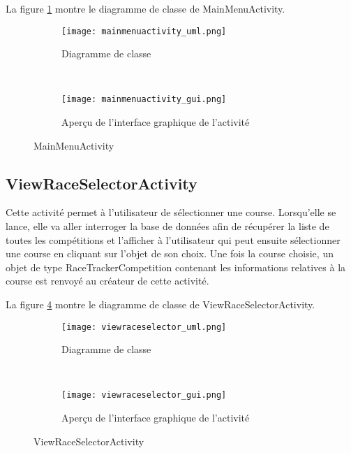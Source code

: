 La figure \ref{fig:mainmenuactivity_uml} montre le diagramme de classe de MainMenuActivity.

\begin{figure}[htb!]
    \centering
    \begin{subfigure}[htb]{0.49\textwidth}
		\texttt{[image: mainmenuactivity\_uml.png]} 
		\caption{Diagramme de classe}
		\label{fig:mainmenuactivity_uml}
    \end{subfigure}
    ~ %
    \begin{subfigure}[htb]{0.49\textwidth}
		\texttt{[image: mainmenuactivity\_gui.png]} 
		\caption{Aperçu de l'interface graphique de l'activité}
		\label{fig:mainmenuactivity_gui}
    \end{subfigure}
    \caption{MainMenuActivity}\label{fig:mainmenuactivity_fig}
\end{figure}

\subsection{ViewRaceSelectorActivity}

Cette activité permet à l'utilisateur de sélectionner une course. Lorsqu'elle se lance, elle va aller interroger la base de données afin de récupérer la liste de toutes les compétitions et l'afficher à l'utilisateur qui peut ensuite sélectionner une course en cliquant sur l'objet de son choix. Une fois la course choisie, un objet de type RaceTrackerCompetition contenant les informations relatives à la course est renvoyé au créateur de cette activité.

La figure \ref{fig:viewraceselector_uml} montre le diagramme de classe de ViewRaceSelectorActivity.

\begin{figure}[htb!]
    \centering
    \begin{subfigure}[htb]{0.49\textwidth}
		\texttt{[image: viewraceselector\_uml.png]} 
		\caption{Diagramme de classe}
		\label{fig:viewraceselector_uml}
    \end{subfigure}
    ~ %
    \begin{subfigure}[htb]{0.49\textwidth}
		\texttt{[image: viewraceselector\_gui.png]} 
		\caption{Aperçu de l'interface graphique de l'activité}
		\label{fig:viewraceselector_gui}
    \end{subfigure}
    \caption{ViewRaceSelectorActivity}\label{fig:viewraceselector_fig}
\end{figure}

